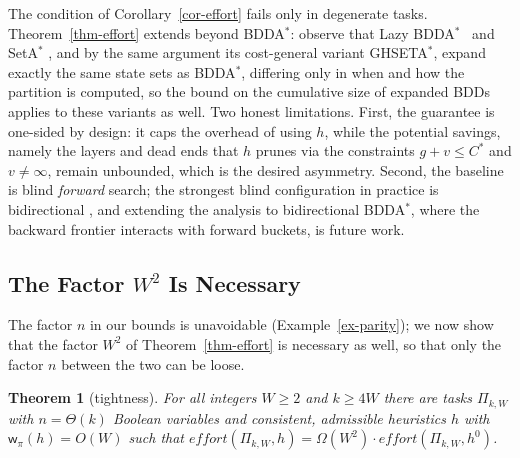 \documentclass[letterpaper]{article}
\newcommand{\task}{\ensuremath{\Pi}}
\newcommand{\hblind}{\ensuremath{h^{0}}}
\newcommand{\copt}{\ensuremath{C^{*}}}
\newcommand{\width}{\ensuremath{\mathsf{w}}}
\newcommand{\effort}{\ensuremath{\mathit{effort}}}
\newcommand{\bddastar}{BDDA\ensuremath{^{*}}}
\newcommand{\ghseta}{GHSETA\ensuremath{^{*}}}
\theoremstyle{plain}
\newtheorem{theorem}{Theorem}
\theoremstyle{definition}
\theoremstyle{remark}
\begin{document}
The condition of Corollary~\ref{cor-effort} fails only in degenerate
tasks. Theorem~\ref{thm-effort} extends beyond \bddastar:
\citet{speck-et-al-icaps2020} observe that Lazy \bddastar\
\citep{torralba-phd2015} and SetA\ensuremath{^{*}}
\citep{jensen-et-al-aij2008}, and by the same argument its
cost-general variant \ghseta, expand exactly the same state sets as
\bddastar, differing only in when and how the partition is computed, so
the bound on the cumulative size of expanded BDDs applies to these
variants as well. Two honest limitations. First, the guarantee is
one-sided by design: it caps the overhead of using $h$, while the
potential savings, namely the layers and dead ends that $h$ prunes via
the constraints $g + v \leq \copt$ and $v \neq \infty$, remain
unbounded, which is the desired asymmetry. Second, the baseline is blind
\emph{forward} search; the strongest blind configuration in practice is
bidirectional \citep{torralba-et-al-aij2017,speck-et-al-jair2025}, and
extending the analysis to bidirectional \bddastar, where the backward
frontier interacts with forward buckets, is future work.


\subsection{The Factor $W^2$ Is Necessary}

The factor $n$ in our bounds is unavoidable
(Example~\ref{ex-parity}); we now show that the factor $W^{2}$ of
Theorem~\ref{thm-effort} is necessary as well, so that only the factor
$n$ between the two can be loose.

\begin{theorem}[tightness]
\label{thm-tight}
For all integers $W \geq 2$ and $k \geq 4W$ there are tasks
$\task_{k,W}$ with $n = \Theta(k)$ Boolean variables and consistent,
admissible heuristics $h$ with $\width_\pi(h) = O(W)$ such that
$\effort(\task_{k,W}, h) = \Omega(W^{2}) \cdot
\effort(\task_{k,W}, \hblind)$.
\end{theorem}
\end{document}
